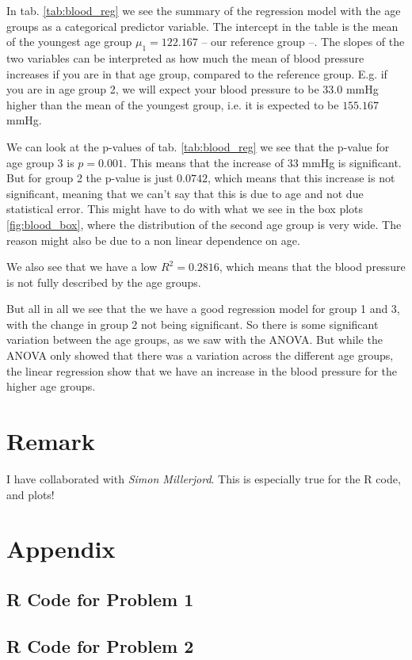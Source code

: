 \documentclass[a4paper,norsk, 10pt]{article}
\begin{document}
In tab. \ref{tab:blood_reg} we see the summary of the regression model with the age groups as a categorical predictor variable. The intercept in the table is the mean of the youngest age group $\mu_1 = 122.167$ --  our reference group --. The slopes of the two variables can be interpreted as how much the mean of blood pressure increases if you are in that age group, compared to the reference group. E.g. if you are in age group 2, we will expect your blood pressure to be $33.0$ mmHg higher than the mean of the youngest group, i.e. it is expected to be $155.167$ mmHg.

We can look at the p-values of tab. \ref{tab:blood_reg} we see that the p-value for age group 3 is $p=0.001$. This means that the increase of $33$ mmHg is significant. But for group 2 the p-value is just $0.0742$, which means that this increase is not significant, meaning that we can't say that this is due to age and not due statistical error. This might have to do with what we see in the box plots \ref{fig:blood_box}, where the distribution of the second age group is very wide. The reason might also be due to a non linear dependence on age.

We also see that we have a low $R^2 = 0.2816$, which means that the blood pressure is not fully described by the age groups.

But all in all we see that the we have a good regression model for group 1 and 3, with the change in group 2 not being significant. So there is some significant variation between the age groups, as we saw with the ANOVA. But while the ANOVA only showed that there was a variation across the different age groups, the linear regression show that we have an increase in the blood pressure for the higher age groups.

\section*{Remark}
I have collaborated with \textit{Simon Millerjord}. This is especially true for the R code, and plots!


\newpage
\section*{Appendix}
\subsection*{R Code for Problem 1}



\newpage

\subsection*{R Code for Problem 2}


\end{document}
